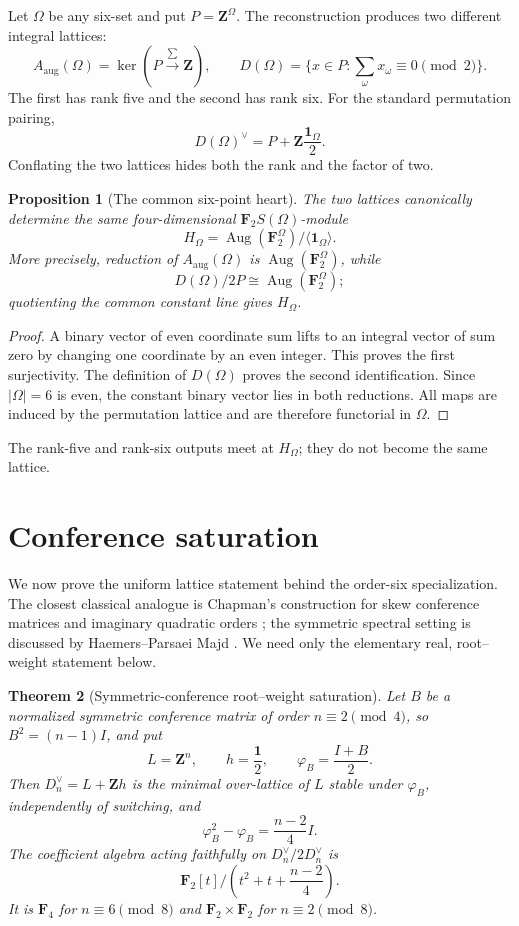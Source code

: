 \documentclass[11pt]{article}
\newtheorem{theorem}{Theorem}[section]
\newtheorem{proposition}[theorem]{Proposition}
\theoremstyle{definition}
\theoremstyle{remark}
\newcommand{\F}{\mathbf F}
\newcommand{\Z}{\mathbf Z}
\newcommand{\Aug}{\operatorname{Aug}}
\begin{document}
Let \(\Omega\) be any six-set and put \(P=\Z^\Omega\).  The reconstruction
produces two different integral lattices:
\[
 A_{\mathrm{aug}}(\Omega)=\ker(P\xrightarrow{\sum}\Z),
 \qquad
 D(\Omega)=\{x\in P:\textstyle\sum_\omega x_\omega\equiv0\pmod2\}.
\]
The first has rank five and the second has rank six.  For the standard
permutation pairing,
\[
                  D(\Omega)^\vee=P+\Z\frac{\mathbf1_\Omega}{2}.
\]
Conflating the two lattices hides both the rank and the factor of two.

\begin{proposition}[The common six-point heart]
\label{prop:common-heart}
The two lattices canonically determine the same four-dimensional
\(\F_2S(\Omega)\)-module
\[
 H_\Omega=\Aug(\F_2^\Omega)/\langle\mathbf1_\Omega\rangle.
\]
More precisely, reduction of \(A_{\mathrm{aug}}(\Omega)\) is
\(\Aug(\F_2^\Omega)\), while
\[
 D(\Omega)/2P\cong\Aug(\F_2^\Omega);
\]
quotienting the common constant line gives \(H_\Omega\).
\end{proposition}

\begin{proof}
A binary vector of even coordinate sum lifts to an integral vector of sum
zero by changing one coordinate by an even integer.  This proves the first
surjectivity.  The definition of \(D(\Omega)\) proves the second
identification.  Since \(|\Omega|=6\) is even, the constant binary vector lies
in both reductions.  All maps are induced by the permutation lattice and
are therefore functorial in \(\Omega\).
\end{proof}

The rank-five and rank-six outputs meet at \(H_\Omega\); they do not become
the same lattice.

\section{Conference saturation}
\label{sec:conference-saturation}

We now prove the uniform lattice statement behind the order-six specialization.
The closest classical analogue is Chapman's construction for skew conference
matrices and imaginary quadratic orders \cite{Chapman2001}; the symmetric
spectral setting is discussed by Haemers--Parsaei Majd
\cite{HaemersParsaeiMajd2022}.  We need only the elementary real,
root--weight statement below.

\begin{theorem}[Symmetric-conference root--weight saturation]
\label{thm:conference-saturation}
Let \(B\) be a normalized symmetric conference matrix of order
\(n\equiv2\pmod4\), so \(B^2=(n-1)I\), and put
\[
 L=\Z^n,\qquad h=\frac{\mathbf1}{2},\qquad
 \varphi_B=\frac{I+B}{2}.
\]
Then \(D_n^\vee=L+\Z h\) is the minimal over-lattice of \(L\) stable under
\(\varphi_B\), independently of switching, and
\[
              \varphi_B^2-\varphi_B=\frac{n-2}{4}I.
\]
The coefficient algebra acting faithfully on \(D_n^\vee/2D_n^\vee\) is
\[
 \F_2[t]\big/\left(t^2+t+\frac{n-2}{4}\right).
\]
It is \(\F_4\) for \(n\equiv6\pmod8\) and
\(\F_2\times\F_2\) for \(n\equiv2\pmod8\).
\end{theorem}
\end{document}
